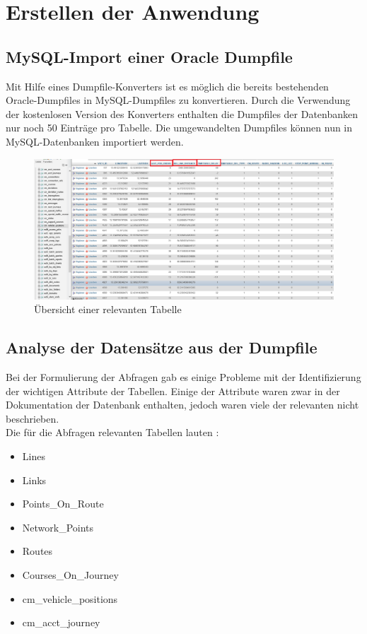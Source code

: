 \documentclass[a4paper, 12.5pt]{scrartcl}
\begin{document}
\section{Erstellen der Anwendung}

\subsection{MySQL-Import einer Oracle Dumpfile}

Mit Hilfe eines Dumpfile-Konverters ist es möglich die bereits bestehenden Oracle-Dumpfiles in MySQL-Dumpfiles zu konvertieren. Durch die Verwendung der kostenlosen Version des Konverters enthalten die Dumpfiles der Datenbanken nur noch 50 Einträge pro Tabelle. 
Die umgewandelten Dumpfiles können nun in MySQL-Datenbanken importiert werden.

\begin{figure}[h]
	\centering
	\includegraphics[scale=0.4]{Datenbank.png}
	\caption{Übersicht einer relevanten Tabelle}
	\label{img:grafik-DB}
\end{figure}

\subsection{Analyse der Datensätze aus der Dumpfile}
Bei der Formulierung der Abfragen gab es einige Probleme mit der Identifizierung der wichtigen Attribute der Tabellen. Einige der Attribute waren zwar in der Dokumentation der Datenbank enthalten, jedoch waren viele der relevanten nicht beschrieben. 
\\Die für die Abfragen relevanten Tabellen lauten :

\begin{itemize} 
\item Lines
\item Links
\item Points\_On\_Route
\item Network\_Points
\item Routes
\item Courses\_On\_Journey
\item cm\_vehicle\_positions
\item cm\_acct\_journey
\end{itemize}\\
\end{document}
